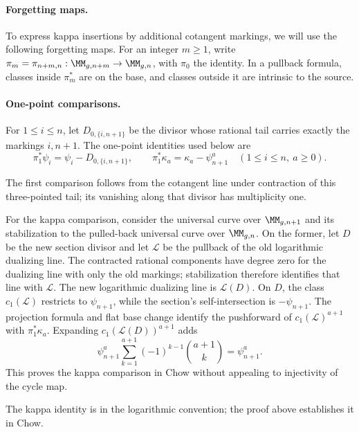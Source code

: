 \paragraph{Forgetting maps.}
To express kappa insertions by additional cotangent markings, we will
use the following forgetting maps.
For an integer $m\geq1$, write
$\pi_m=\pi_{n+m,n}:\MM_{g,n+m}\to\MM_{g,n}$, with
$\pi_0$ the identity.  In a pullback formula, classes inside
$\pi_m^*$ are on the base, and classes outside it are intrinsic to
the source.

\paragraph{One-point comparisons.}
For $1\leq i\leq n$, let
$D_{0,\{i,n+1\}}$ be the divisor whose rational tail carries exactly
the markings $i,n+1$.  The one-point identities used below are
\begin{equation}
\label{eq:s02:one-point-comparison}
\pi_1^*\psi_i=\psi_i-D_{0,\{i,n+1\}},\qquad
\pi_1^*\kappa_a=\kappa_a-\psi_{n+1}^a
\quad(1\leq i\leq n,\ a\geq0).
\end{equation}
\begin{prf}
The first comparison follows from the
cotangent line under contraction of this three-pointed tail; its
vanishing along that divisor has multiplicity one.

For the kappa comparison, consider the universal curve over
$\MM_{g,n+1}$ and its stabilization to the pulled-back universal
curve over $\MM_{g,n}$.  On the former, let $D$ be the new section
divisor and let $\mathcal L$ be the pullback of the old logarithmic
dualizing line.  The contracted rational components have degree zero
for the dualizing line with only the old markings; stabilization
therefore identifies that line with $\mathcal L$.  The new
logarithmic dualizing line is $\mathcal L(D)$.  On $D$, the class
$c_1(\mathcal L)$ restricts to $\psi_{n+1}$, while the section's
self-intersection is $-\psi_{n+1}$.  The projection formula and flat
base change identify the pushforward of $c_1(\mathcal L)^{a+1}$
with $\pi_1^*\kappa_a$.  Expanding $c_1(\mathcal L(D))^{a+1}$ adds
\[
\psi_{n+1}^a\sum_{k=1}^{a+1}(-1)^{k-1}\binom{a+1}{k}
=\psi_{n+1}^a.
\]
This proves the kappa comparison in Chow without appealing to
injectivity of the cycle map.
\end{prf}

\begin{rmk}
\label{rmk:s02:comparison-source}
The kappa identity is \cite[(2.10)]{KMZ96v1} in the logarithmic
convention; the proof above establishes it in Chow.
\end{rmk}


